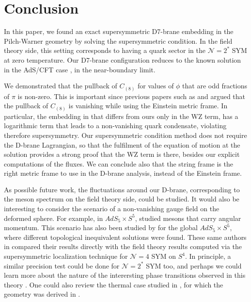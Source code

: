 \section{Conclusion}

In this paper, we found an exact supersymmetric D7-brane embedding in the Pilch-Warner geometry by solving the supersymmetric condition. In the field theory side, this setting corresponds to having a quark sector in the $\mathcal{N}=2^*$ SYM at zero temperature. Our D7-brane configuration reduces to the known solution in the AdS/CFT case \cite{Karch:2005ms}, in the near-boundary limit. 

We demonstrated that the pullback of $C_{(8)}$ for values of $\phi$ that are odd fractions of $\pi$ is non-zero. This is important since previous papers such as \cite{Albash:2011nw} and \cite{Evans:2005ti} argued that the pullback of $C_{(8)}$ is vanishing while using the Einstein metric frame. In particular, the embedding in \cite{Albash:2011nw} that differs from ours only in the WZ term, has a logarithmic term that leads to a non-vanishing quark condensate, violating therefore supersymmetry. Our supersymmetric condition method does not require the D-brane Lagrangian, so that the fulfilment of the equation of motion at the solution provides a strong proof that the WZ term is there, besides our explicit computations of the fluxes. We can conclude also that the string frame is the right metric frame to use in the D-brane analysis, instead of the Einstein frame. 

As possible future work, the fluctuations around our D-brane, corresponding to the meson spectrum on the field theory side, could be studied. It would also be interesting to consider the scenario of a non-vanishing gauge field on the deformed sphere. For example, in $AdS_5 \times S^5$, \cite{Kruczenski:2003be} studied mesons that carry angular momentum. This scenario has also been studied by \cite{Karch:2015vra} for the global $AdS_5 \times S^5$, where different topological inequivalent solutions were found. These same authors in \cite{Karch:2015kfa} compared their results directly with the field theory results computed via the supersymmetric localization technique \cite{Pestun:2007rz} for $\mathcal{N}=4$ SYM on $S^4$. In principle, a similar precision test could be done for $\mathcal{N}=2^*$ SYM too, and perhaps we could learn more about the nature of the interersting phase transitions observed in this theory \cite{Russo:2013qaa, Zarembo:2014ooa, Chen:2014vka}. One could also review the thermal case studied in \cite{Albash:2011dq}, for which the geometry was derived in \cite{Buchel:2003ah}.


